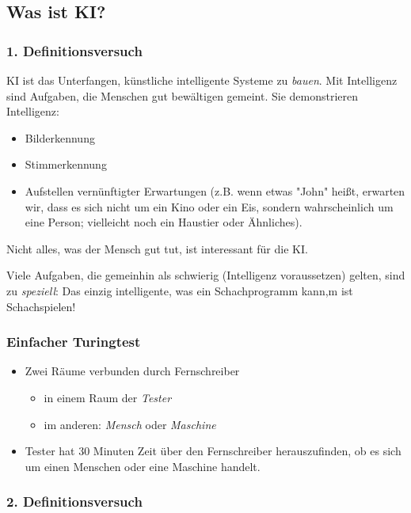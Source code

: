 \documentclass[runningheads,deutsch]{llncs}
\begin{document}
\subsection{Was ist KI?}

\subsubsection{1. Definitionsversuch}

KI ist das Unterfangen, künstliche intelligente Systeme zu \textit{bauen}.
Mit Intelligenz sind Aufgaben, die Menschen gut bewältigen gemeint. Sie
demonstrieren Intelligenz:

\begin{itemize}
    \item Bilderkennung
    \item Stimmerkennung
    \item Aufstellen vernünftigter Erwartungen (z.B. wenn etwas "John" heißt, erwarten wir, dass es sich nicht um ein Kino oder ein Eis, sondern wahrscheinlich um eine Person; vielleicht noch ein Haustier oder Ähnliches). 
\end{itemize}

Nicht alles, was der Mensch gut tut, ist interessant für die KI. 

Viele Aufgaben, die gemeinhin als schwierig (Intelligenz voraussetzen) gelten, sind zu \textit{speziell}: Das einzig intelligente, was ein Schachprogramm kann,m ist Schachspielen!

\subsubsection{Einfacher Turingtest}
\begin{itemize}
    \item Zwei Räume verbunden durch Fernschreiber
    \begin{itemize}
        \item in einem Raum der \textit{Tester}
        \item im anderen: \textit{Mensch} oder \textit{Maschine}
    \end{itemize}
    \item Tester hat 30 Minuten Zeit über den Fernschreiber herauszufinden, ob es sich um einen Menschen oder eine Maschine handelt.
\end{itemize}

\subsubsection{2. Definitionsversuch}
\end{document}
